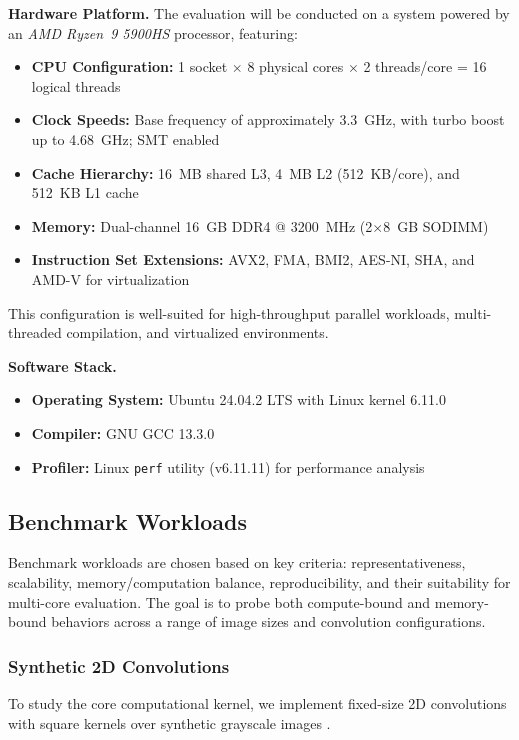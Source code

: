 \documentclass[conference, 10pt]{IEEEtran}
\begin{document}
\textbf{Hardware Platform.} The evaluation will be conducted on a system powered by an \textit{AMD Ryzen\texttrademark~9 5900HS} processor, featuring:
\begin{itemize}
    \item \textbf{CPU Configuration:} 1 socket $\times$ 8 physical cores $\times$ 2 threads/core = 16 logical threads
    \item \textbf{Clock Speeds:} Base frequency of approximately 3.3~GHz, with turbo boost up to 4.68~GHz; SMT enabled
    \item \textbf{Cache Hierarchy:} 16~MB shared L3, 4~MB L2 (512~KB/core), and 512~KB L1 cache
    \item \textbf{Memory:} Dual-channel 16~GB DDR4 @ 3200~MHz (2$\times$8~GB SODIMM)
    \item \textbf{Instruction Set Extensions:} AVX2, FMA, BMI2, AES-NI, SHA, and AMD-V for virtualization
\end{itemize}
This configuration is well-suited for high-throughput parallel workloads, multi-threaded compilation, and virtualized environments.

\textbf{Software Stack.}
\begin{itemize}
    \item \textbf{Operating System:} Ubuntu 24.04.2 LTS with Linux kernel 6.11.0
    \item \textbf{Compiler:} GNU GCC 13.3.0
    \item \textbf{Profiler:} Linux \texttt{perf} utility (v6.11.11) for performance analysis
\end{itemize}



\subsection{\textbf{Benchmark Workloads}}

Benchmark workloads are chosen based on key criteria: representativeness, scalability, memory/computation balance, reproducibility, and their suitability for multi-core evaluation. The goal is to probe both compute-bound and memory-bound behaviors across a range of image sizes and convolution configurations.

\subsubsection{\textbf{Synthetic 2D Convolutions}}

To study the core computational kernel, we implement fixed-size 2D convolutions with square kernels over synthetic grayscale images \cite{Tousimojarad2017}.
\end{document}
